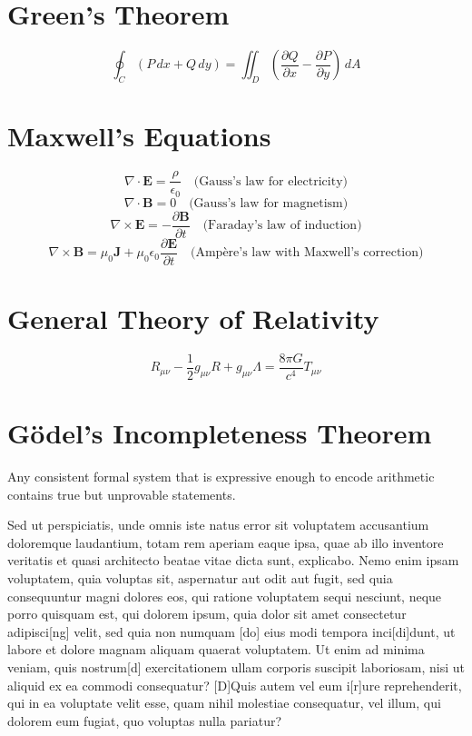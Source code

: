 \documentclass[a5paper, 10pt, openany]{book} %
\begin{document}
\section*{Green's Theorem}
\[
\oint_C \left( P \, dx + Q \, dy \right) = \iint_D \left( \frac{\partial Q}{\partial x} - \frac{\partial P}{\partial y} \right) \, dA
\]

\section*{Maxwell's Equations}
\[
\nabla \cdot \mathbf{E} = \frac{\rho}{\epsilon_0} \quad \text{(Gauss's law for electricity)}
\]
\[
\nabla \cdot \mathbf{B} = 0 \quad \text{(Gauss's law for magnetism)}
\]
\[
\nabla \times \mathbf{E} = -\frac{\partial \mathbf{B}}{\partial t} \quad \text{(Faraday's law of induction)}
\]
\[
\nabla \times \mathbf{B} = \mu_0 \mathbf{J} + \mu_0 \epsilon_0 \frac{\partial \mathbf{E}}{\partial t} \quad \text{(Ampère's law with Maxwell's correction)}
\]

\section*{General Theory of Relativity}
\[
R_{\mu\nu} - \frac{1}{2} g_{\mu\nu} R + g_{\mu\nu} \Lambda = \frac{8 \pi G}{c^4} T_{\mu\nu}
\]

\section*{Gödel's Incompleteness Theorem}

Any consistent formal system that is expressive enough to encode arithmetic contains true but unprovable statements.


Sed ut perspiciatis, unde omnis iste natus error sit voluptatem accusantium doloremque laudantium, totam rem aperiam eaque ipsa, quae ab illo inventore veritatis et quasi architecto beatae vitae dicta sunt, explicabo. Nemo enim ipsam voluptatem, quia voluptas sit, aspernatur aut odit aut fugit, sed quia consequuntur magni dolores eos, qui ratione voluptatem sequi nesciunt, neque porro quisquam est, qui dolorem ipsum, quia dolor sit amet consectetur adipisci[ng] velit, sed quia non numquam [do] eius modi tempora inci[di]dunt, ut labore et dolore magnam aliquam quaerat voluptatem. Ut enim ad minima veniam, quis nostrum[d] exercitationem ullam corporis suscipit laboriosam, nisi ut aliquid ex ea commodi consequatur? [D]Quis autem vel eum i[r]ure reprehenderit, qui in ea voluptate velit esse, quam nihil molestiae consequatur, vel illum, qui dolorem eum fugiat, quo voluptas nulla pariatur?
\end{document}
